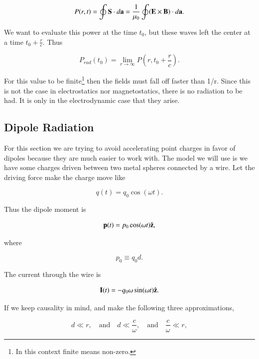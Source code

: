 \documentclass[preprint, review,12pt]{elsarticle}
\def\x{\times}
\def\.{\cdot}
\def\b{\textbf}
\def\={\equiv}
\def\and{\quad \text{and} \quad}
\def\9{\left(}
\def\0{\right)}
\newcommand{\hb}[1]{\hat{\b #1}}
\begin{document}
\begin{equation}
    P(r,t) = \oint \b S \. d \b a = \frac{1}{\mu_0} \oint (\b E \x \b B) \. d\b a.
\end{equation}

We want to evaluate this power at the time $t_0$, but these waves left the center at a time $t_0 + \frac{r}{c}$. Thus 

\begin{equation}
    P_{rad}(t_0) = \lim_{r\to\infty} P \9 r, t_0 + \frac{r}{c} \0.
\end{equation}

For this value to be finite\footnote{In this context finite means non-zero.} then the fields must fall off faster than 1/r. Since this is not the case in electrostatics nor magnetostatics, there is no radiation to be had. It is only in the electrodynamic case that they arise. 

\subsection{Dipole Radiation}

For this section we are trying to avoid accelerating point charges in favor of dipoles because they are much easier to work with. The model we will use is we have some charges driven between two metal spheres connected by a wire. Let the driving force make the charge move like

\begin{equation}
    q(t) = q_0 \cos(\omega t).
\end{equation}

Thus the dipole moment is 

\begin{equation}
    \b p(t) = p_0 \cos(\omega t) \hb{z},
\end{equation}

where 

\begin{equation}
    p_0 \= q_0d.
\end{equation}

The current through the wire is

\begin{equation}
    \b I(t) = -q_0 \omega \sin(\omega t) \hb{z}.
\end{equation}

If we keep causality in mind, and make the following three approximations, 

\begin{equation}
    d \ll r, \and d \ll \frac{c}{\omega}, \and \frac{c}{\omega} \ll r,
\end{equation}
\end{document}
